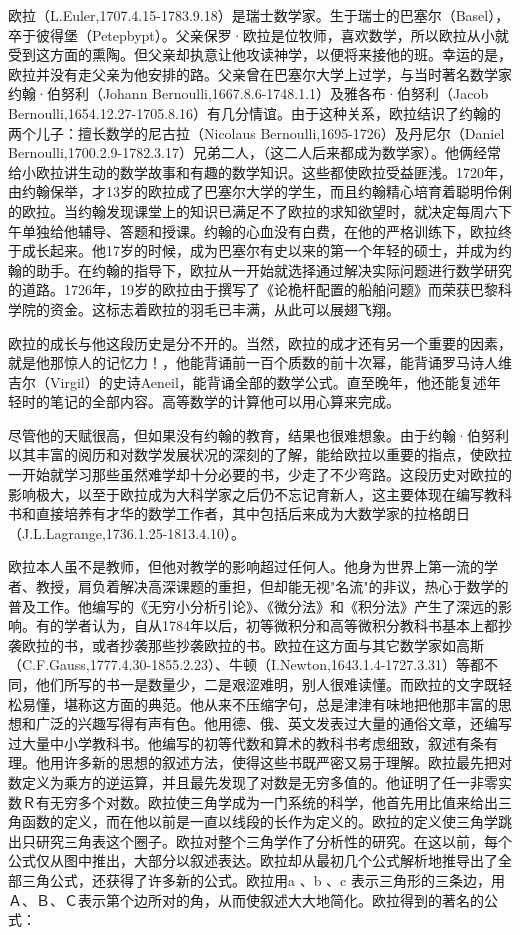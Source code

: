 \documentclass[UTF8]{ctexart}
\begin{document}
欧拉（L.Euler,1707.4.15-1783.9.18）是瑞士数学家。生于瑞士的巴塞尔（Basel），卒于彼得堡（Petepbypt）。父亲保罗·欧拉是位牧师，喜欢数学，所以欧拉从小就受到这方面的熏陶。但父亲却执意让他攻读神学，以便将来接他的班。幸运的是，欧拉并没有走父亲为他安排的路。父亲曾在巴塞尔大学上过学，与当时著名数学家约翰·伯努利（Johann Bernoulli,1667.8.6-1748.1.1）及雅各布·伯努利（Jacob Bernoulli,1654.12.27-1705.8.16）有几分情谊。由于这种关系，欧拉结识了约翰的两个儿子：擅长数学的尼古拉（Nicolaus Bernoulli,1695-1726）及丹尼尔（Daniel Bernoulli,1700.2.9-1782.3.17）兄弟二人，（这二人后来都成为数学家）。他俩经常给小欧拉讲生动的数学故事和有趣的数学知识。这些都使欧拉受益匪浅。1720年，由约翰保举，才13岁的欧拉成了巴塞尔大学的学生，而且约翰精心培育着聪明伶俐的欧拉。当约翰发现课堂上的知识已满足不了欧拉的求知欲望时，就决定每周六下午单独给他辅导、答题和授课。约翰的心血没有白费，在他的严格训练下，欧拉终于成长起来。他17岁的时候，成为巴塞尔有史以来的第一个年轻的硕士，并成为约翰的助手。在约翰的指导下，欧拉从一开始就选择通过解决实际问题进行数学研究的道路。1726年，19岁的欧拉由于撰写了《论桅杆配置的船舶问题》而荣获巴黎科学院的资金。这标志着欧拉的羽毛已丰满，从此可以展翅飞翔。

欧拉的成长与他这段历史是分不开的。当然，欧拉的成才还有另一个重要的因素，就是他那惊人的记忆力！，他能背诵前一百个质数的前十次幂，能背诵罗马诗人维吉尔（Virgil）的史诗Aeneil，能背诵全部的数学公式。直至晚年，他还能复述年轻时的笔记的全部内容。高等数学的计算他可以用心算来完成。

尽管他的天赋很高，但如果没有约翰的教育，结果也很难想象。由于约翰·伯努利以其丰富的阅历和对数学发展状况的深刻的了解，能给欧拉以重要的指点，使欧拉一开始就学习那些虽然难学却十分必要的书，少走了不少弯路。这段历史对欧拉的影响极大，以至于欧拉成为大科学家之后仍不忘记育新人，这主要体现在编写教科书和直接培养有才华的数学工作者，其中包括后来成为大数学家的拉格朗日（J.L.Lagrange,1736.1.25-1813.4.10）。

欧拉本人虽不是教师，但他对教学的影响超过任何人。他身为世界上第一流的学者、教授，肩负着解决高深课题的重担，但却能无视"名流"的非议，热心于数学的普及工作。他编写的《无穷小分析引论》、《微分法》和《积分法》产生了深远的影响。有的学者认为，自从1784年以后，初等微积分和高等微积分教科书基本上都抄袭欧拉的书，或者抄袭那些抄袭欧拉的书。欧拉在这方面与其它数学家如高斯（C.F.Gauss,1777.4.30-1855.2.23）、牛顿（I.Newton,1643.1.4-1727.3.31）等都不同，他们所写的书一是数量少，二是艰涩难明，别人很难读懂。而欧拉的文字既轻松易懂，堪称这方面的典范。他从来不压缩字句，总是津津有味地把他那丰富的思想和广泛的兴趣写得有声有色。他用德、俄、英文发表过大量的通俗文章，还编写过大量中小学教科书。他编写的初等代数和算术的教科书考虑细致，叙述有条有理。他用许多新的思想的叙述方法，使得这些书既严密又易于理解。欧拉最先把对数定义为乘方的逆运算，并且最先发现了对数是无穷多值的。他证明了任一非零实数Ｒ有无穷多个对数。欧拉使三角学成为一门系统的科学，他首先用比值来给出三角函数的定义，而在他以前是一直以线段的长作为定义的。欧拉的定义使三角学跳出只研究三角表这个圈子。欧拉对整个三角学作了分析性的研究。在这以前，每个公式仅从图中推出，大部分以叙述表达。欧拉却从最初几个公式解析地推导出了全部三角公式，还获得了许多新的公式。欧拉用a 、b 、c 表示三角形的三条边，用Ａ、Ｂ、Ｃ表示第个边所对的角，从而使叙述大大地简化。欧拉得到的著名的公式：
\end{document}
